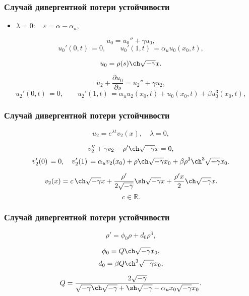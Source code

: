 \documentclass[fullscreen=true, unicode, bookmarks=false]{beamer}
\begin{document}
\begin{frame}
\frametitle{ Случай дивергентной потери устойчивости }

\begin{itemize}
\item { $ \lambda = 0: \quad \varepsilon=\alpha-\alpha_u, $
}
\end{itemize}

\medskip

\begin{equation}
	u_0 = u_0'' + \gamma u_0,
\end{equation}
\begin{equation}
	u_0'(0, t) \, = 0, \qquad u_0'(1, t) \, = \alpha_u u_0(x_0, t),
\end{equation}

$$ u_0 = \rho(s) \ch \sqrt{-\gamma} x. $$

\medskip

\begin{equation}
	\dot u_2 + \frac{\partial u_0}{\partial s} = u_2'' + \gamma u_2,
\end{equation}
\begin{equation}
	u_2'(0, t) \, = 0, \qquad u_2'(1, t) \, = \alpha_u u_2(x_0, t) + u_0(x_0, t) + \beta u_0^3(x_0, t),
\end{equation}

\end{frame}

\begin{frame}
\frametitle{ Случай дивергентной потери устойчивости }

$$ u_2 = e^{\lambda t}v_2(x), \quad \lambda = 0, $$

\medskip

\begin{equation}
	v_2'' + \gamma v_2 - \rho' \ch \sqrt{-\gamma} x = 0,
\end{equation}
\begin{equation}
	v_2'(0) \, = 0, \quad v_2'(1) \, = \alpha_u v_2(x_0) + \rho \ch \sqrt{-\gamma} x_0 + \beta \rho^3\ch^3 \sqrt{-\gamma} x_0.
\end{equation}

\medskip

$$ v_2(x) = c\,\ch \sqrt{-\gamma} x + \frac{\rho'}{2\sqrt{-\gamma}}\sh\sqrt{-\gamma}x + \frac{\rho'x}{2} \ch\sqrt{-\gamma}x. $$
$$ c \in \mathbb{R}. $$

\end{frame}

\begin{frame}
\frametitle{ Случай дивергентной потери устойчивости }

\begin{equation}
	\rho' = \phi_0 \rho + d_0 \rho^3,
\end{equation}

\bigskip

$$ \phi_0 = Q \ch \sqrt{-\gamma} x_0, $$
$$ d_0 = \beta Q \ch^3 \sqrt{-\gamma} x_0, $$

$$ Q = \frac{2\sqrt{-\gamma}}{\sqrt{-\gamma}\ch\sqrt{-\gamma} + \sh\sqrt{-\gamma} - \alpha_u x_0 \sqrt{-\gamma} x_0}. $$

\end{frame}
\end{document}
